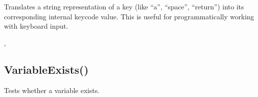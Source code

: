 \documentclass[letterpaper,10pt,english]{sphinxmanual}
\begin{document}
\sphinxAtStartPar
{}

\sphinxAtStartPar
Translates a string representation of a key (like “a”, “space”, “return”) into its corresponding internal keycode value. This is useful for programmatically working with keyboard input.

\sphinxAtStartPar
{}

\begin{sphinxVerbatim}[commandchars=\\\{\}]
\end{sphinxVerbatim}

\sphinxAtStartPar
{}

\begin{sphinxVerbatim}[commandchars=\\\{\}]
\end{sphinxVerbatim}

\sphinxAtStartPar
{}

\sphinxAtStartPar
{}, 

\ignorespaces 

\subsection{VariableExists()}
\label{\detokenize{reference/peblenvironment:variableexists}}\label{\detokenize{reference/peblenvironment:index-67}}
\sphinxAtStartPar
{}

\sphinxAtStartPar
Tests whether a variable exists.

\sphinxAtStartPar
{}

\begin{sphinxVerbatim}[commandchars=\\\{\}]
\end{sphinxVerbatim}
\end{document}

